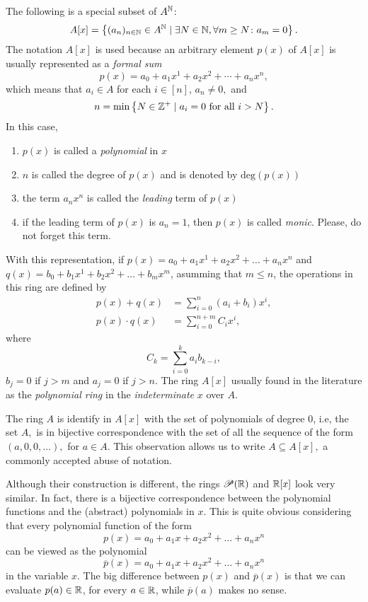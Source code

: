\documentclass[11pt,a4paper]{article}
\begin{document}
\begin{exa}[Important]
    The following  is a special subset of $A^{\mathbb{N}}$:
\[
A[x]=\left\lbrace (a_n)_{n\in \mathbb{N}} \in A^{\mathbb{N}} \mid  \exists N\in \mathbb{N},\forall m\geq N\colon a_m=0 \right\rbrace.
\]
The notation  $A[x]$ is used because an arbitrary element $p(x)$ of $A[x]$ is usually represented as a \emph{formal sum}
\[p(x)=a_0+a_1x^1+a_2x^2+
	\cdots+a_nx^n,\]
which means that $a_i\in A$ for each $i\in[n]$, $ a_n\neq 0,$ and 
\[
    n=\min\left\lbrace N\in \mathbb{Z}^+ \mid  a_i = 0 \text{ for all } i >N \right\rbrace. 
\]
In this case,
\begin{enumerate}[label=(\roman*)]
    \item $p(x)$ is called a \emph{polynomial} in $x$
    \item $n$ is called the degree of $p(x)$ and is denoted by $\text{deg}(p(x))$
    \item the term $a_nx^n$ is called the \emph{leading} term of $p(x)$
    \item if the leading term of $p(x)$ is $a_n=1$, then $p(x)$ is called \emph{monic}. Please, do not forget this term.
\end{enumerate} 

With this representation, if $p(x)=a_0+a_1x^1+a_2x^2+
	\ldots+a_nx^n$ and $q(x)=b_0+b_1x^1+b_2x^2+
	\ldots+b_mx^m$, asumming that $m\leq n$, the operations in this ring are defined by
\begin{align*}
    p(x)+q(x)&=\sum_{i=0}^{n} (a_i+b_i)x^i,\\
    p(x)\cdot q(x)&= \sum_{i=0}^{n+m} C_i x^i,
\end{align*}
where \[C_k=\sum_{i=0}^{k} a_ib_{k-i},\] $b_j=0$ if $j> m$ and $a_j=0$ if $j>n$. The ring $A[x]$ usually found in the literature as the \textit{polynomial ring} in the  \emph{indeterminate} $x$ over \(A\). 
\end{exa}

\begin{rem}
    The ring $A$ is identify in $A[x]$ with the set of polynomials of degree 0, i.e, the set $A,$ is in bijective correspondence with the set of all the sequence of the form
    \((a,0,0,\ldots),\)
    for $a\in A.$ This observation allows us to write $A\subseteq A[x],$  a commonly accepted abuse of notation. 
\end{rem}

\begin{rem}
    Although their construction is different, the rings $\mathscr{P}(\mathbb{R})$ and $\mathbb{R}[x]$ look very similar. In fact, there is a bijective correspondence between the polynomial functions and the (abstract) polynomials in $x$. 
    This is quite obvious considering that every polynomial function of the form 
    \[p(x)=a_0+a_1x+a_2x^2+\ldots + a_n x^n\]
    can be viewed as the polynomial 
    \[\overline{p}(x)=a_0+a_1x+a_2x^2+\ldots + a_n x^n\]
    in the variable $x$. The big difference between $p(x)$ and $\overline{p}(x)$ is that we can evaluate $p(a)\in\mathbb{R}$, for every $a\in\mathbb{R}$, while $\overline{p}(a)$ makes no sense.
\end{rem}
\end{document}
